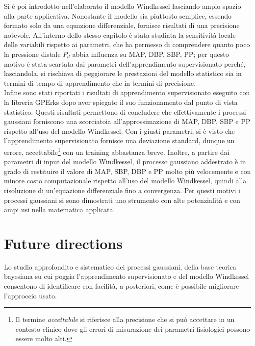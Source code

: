 Si è poi introdotto nell'elaborato il modello Windkessel lasciando ampio spazio alla parte applicativa. Nonostante il modello sia piuttosto semplice, essendo formato solo da una equazione differenziale, fornisce risultati di una precisione notevole. All'interno dello stesso capitolo è stata studiata la sensitività locale delle variabili rispetto ai parametri, che ha permesso di comprendere quanto poco la pressione distale $P_d$ abbia influenza su MAP, DBP, SBP, PP; per questo motivo è stata scartata dai parametri dell'apprendimento supervisionato perché, lasciandola, si rischiava di peggiorare le prestazioni del modello statistico sia in termini di tempo di apprendimento che in termini di precisione.\\

Infine sono stati riportati i risultati di apprendimento supervisionato eseguito con la libreria GPErks dopo aver spiegato il suo funzionamento dal punto di vista statistico. Questi risultati permettono di concludere che effettivamente i processi gaussiani forniscono una scorciatoia all'approssimazione di MAP, DBP, SBP e PP rispetto all'uso del modello Windkessel. Con i giusti parametri, si è visto che l'apprendimento supervisionato fornisce una deviazione standard, dunque un errore, accettabile\footnote{Il termine \textit{accettabile} si riferisce alla precisione che si può accettare in un contesto clinico dove gli errori di misurazione dei parametri fisiologici possono essere molto alti.} con un training abbastanza breve. Inoltre, a partire dai parametri di input del modello Windkessel, il processo gaussiano addestrato è in grado di restituire il valore di MAP, SBP, DBP e PP molto più velocemente e con minore costo computazionale rispetto all'uso del modello Windkessel, quindi alla risoluzione di un'equazione differenziale fino a convergenza. Per questi motivi i processi gaussiani si sono dimostrati uno strumento con alte potenzialità e con ampi usi nella matematica applicata.



\section{Future directions}
Lo studio approfondito e sistematico dei processi gaussiani, della base teorica bayesiana su cui poggia l'apprendimento supervisionato e del modello Windkessel consentono di identificare con facilità, a posteriori, come è possibile migliorare l'approccio usato.\\

